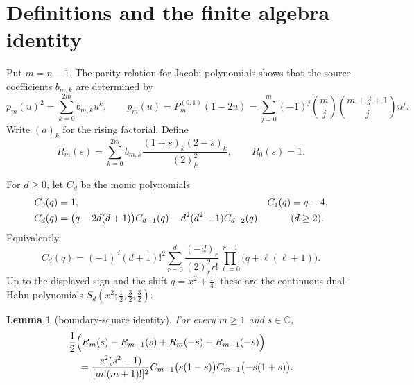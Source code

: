 \documentclass[11pt]{article}
\newtheorem{lemma}{Lemma}
\begin{document}
\section{Definitions and the finite algebra identity}

Put $m=n-1$.  The parity relation for Jacobi polynomials shows that the source coefficients $b_{m,k}$ are determined by
\begin{equation}\label{eq:bdef}
 p_m(u)^2=\sum_{k=0}^{2m}b_{m,k}u^k,
 \qquad
 p_m(u)=P_m^{(0,1)}(1-2u)
 =\sum_{j=0}^m(-1)^j\binom mj\binom{m+j+1}{j}u^j.
\end{equation}
Write $(a)_k$ for the rising factorial.  Define
\begin{equation}\label{eq:Rdef}
 R_m(s)=\sum_{k=0}^{2m}b_{m,k}
 \frac{(1+s)_k(2-s)_k}{(2)_k^2},
 \qquad R_0(s)=1.
\end{equation}

For $d\ge0$, let $C_d$ be the monic polynomials
\begin{align}
 C_0(q)&=1, & C_1(q)&=q-4,\label{eq:Crec}\\
 C_d(q)&=\bigl(q-2d(d+1)\bigr)C_{d-1}(q)
 -d^2(d^2-1)C_{d-2}(q) &&(d\ge2).\notag
\end{align}
Equivalently,
\begin{equation}\label{eq:Chyp}
 C_d(q)=(-1)^d(d+1)!^2
 \sum_{r=0}^d
 \frac{(-d)_r}{(2)_r^2r!}
 \prod_{\ell=0}^{r-1}\bigl(q+\ell(\ell+1)\bigr).
\end{equation}
Up to the displayed sign and the shift $q=x^2+\tfrac14$, these are the continuous-dual-Hahn polynomials
$S_d(x^2;\tfrac12,\tfrac32,\tfrac32)$.

\begin{lemma}[boundary-square identity]\label{lem:square}
For every $m\ge1$ and $s\in\mathbb C$,
\begin{align}
 &\frac12\Bigl(R_m(s)-R_{m-1}(s)+R_m(-s)-R_{m-1}(-s)\Bigr)\label{eq:algebra}\\
 &\quad=\frac{s^2(s^2-1)}{[m!(m+1)!]^2}
 C_{m-1}\bigl(s(1-s)\bigr)
 C_{m-1}\bigl(-s(1+s)\bigr).\notag
\end{align}
\end{lemma}
\end{document}
